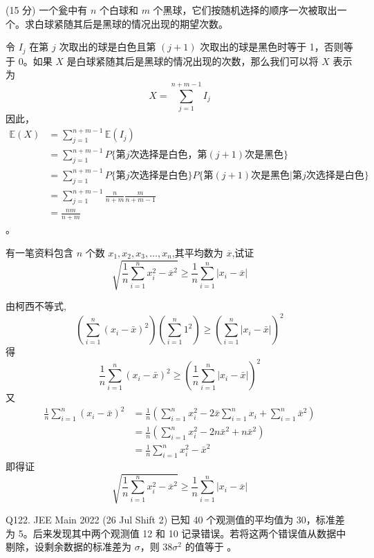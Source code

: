 \begin{questions}
\question (15 分)
一个瓮中有 $n$ 个白球和 $m$ 个黑球，它们按随机选择的顺序一次被取出一个。求白球紧随其后是黑球的情况出现的期望次数。

\begin{solution}
令 $I_j$ 在第 $j$ 次取出的球是白色且第 $(j+1)$ 次取出的球是黑色时等于 1，否则等于 0。如果 $X$ 是白球紧随其后是黑球的情况出现的次数，那么我们可以将 $X$ 表示为
\[
X = \sum_{j=1}^{n+m-1} I_j
\]
因此，
\begin{align*}
\mathbb{E}(X) &= \sum_{j=1}^{n+m-1} \mathbb{E}(I_j) \\
&= \sum_{j=1}^{n+m-1} P\{第 j 次选择是白色，第 (j+1) 次是黑色\} \\
&= \sum_{j=1}^{n+m-1} P\{第 j 次选择是白色\} P\{第 (j+1) 次是黑色 | 第 j 次选择是白色\} \\
&= \sum_{j=1}^{n+m-1} \frac{n}{n+m} \frac{m}{n+m-1} \\
&= \frac{nm}{n+m}
\end{align*}。
\end{solution}

    \question 有一笔资料包含 $n$ 个数 $x_1, x_2, x_3, \dots, x_n$,其平均数为 $\overline{x}$,试证
    \[
    \sqrt{\frac{1}{n}\sum_{i=1}^{n}x_{i}^{2}-\overline{x}^{2}}\ge\frac{1}{n}\sum_{i=1}^{n}|x_{i}-\overline{x}|
    \]
    \begin{solution}
        由柯西不等式,
        \[
        \left(\sum_{i=1}^n(x_i-\bar x)^2 \right) \left(\sum_{i=1}^n 1^2\right) \ge \left(\sum_{i=1}^n |x_i-\bar x| \right)^2
        \]
        得
        \[
        \frac{1}{n} \sum_{i=1}^n (x_i - \bar x)^2 \ge \left( \frac{1}{n} \sum_{i=1}^n |x_i - \bar x| \right)^2
        \]
        又
        \begin{align*}
        \frac{1}{n} \sum_{i=1}^n (x_i - \bar{x})^2 &= \frac{1}{n} \left( \sum_{i=1}^n x_i^2 - 2\bar{x} \sum_{i=1}^n x_i + \sum_{i=1}^n \bar{x}^2 \right)\\
        &= \frac{1}{n} \left( \sum_{i=1}^n x_i^2 - 2n\bar{x}^2 + n\bar{x}^2 \right)\\
        &= \frac{1}{n} \sum_{i=1}^n x_i^2 - \bar{x}^2
        \end{align*}
        即得证
        \[
        \sqrt{\frac{1}{n}\sum_{i=1}^{n}x_{i}^{2}-\overline{x}^{2}}\ge\frac{1}{n}\sum_{i=1}^{n}|x_{i}-\overline{x}|
        \]
    \end{solution}

    \question Q122. JEE Main 2022 (26 Jul Shift 2)
已知 40 个观测值的平均值为 30，标准差为 5。后来发现其中两个观测值 12 和 10 记录错误。若将这两个错误值从数据中剔除，设剩余数据的标准差为 $\sigma$，则 $38\sigma^2$ 的值等于 \underline{\hspace{1cm}}。


\end{questions}
